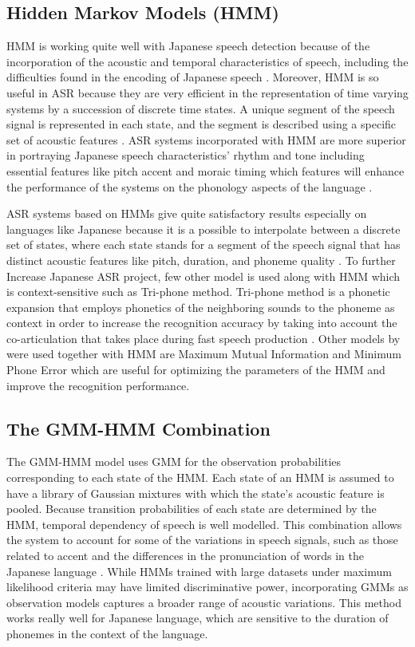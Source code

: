 \subsection{Hidden Markov Models (HMM)}
HMM is working quite well with Japanese speech detection because of the incorporation of the acoustic and temporal characteristics of speech, including the difficulties found in the encoding of Japanese speech \parencite{Tokuda1999Application}. Moreover, HMM is so useful in ASR because they are very efficient in the representation of time varying systems by a succession of discrete time states. A unique segment of the speech signal is represented in each state, and the segment is described using a specific set of acoustic features \parencite{juang1991hidden}. ASR systems incorporated with HMM are more superior in portraying Japanese speech characteristics’ rhythm and tone including essential features like pitch accent and moraic timing which features will enhance the performance of the systems on the phonology aspects of the language \parencite{Tokuda2000HMM}.

ASR systems based on HMMs give quite satisfactory results especially on languages like Japanese because it is a possible to interpolate between a discrete set of states, where each state stands for a segment of the speech signal that has distinct acoustic features like pitch, duration, and phoneme quality \parencite{juang1991hidden}. To further Increase Japanese ASR project, few other model is used along with HMM which is context-sensitive such as Tri-phone method. Tri-phone method is a phonetic expansion that employs phonetics of the neighboring sounds to the phoneme as context in order to increase the recognition accuracy by taking into account the co-articulation that takes place during fast speech production \parencite{Tokuda2000HMM}. Other models by \textcite{gales2008application} were used together with HMM are Maximum Mutual Information and Minimum Phone Error which are useful for optimizing the parameters of the HMM and improve the recognition performance. 


\subsection{The GMM-HMM Combination}
The GMM-HMM model uses GMM for the observation probabilities corresponding to each state of the HMM. Each state of an HMM is assumed to have a library of Gaussian mixtures with which the state’s acoustic feature is pooled. Because transition probabilities of each state are determined by the HMM, temporal dependency of speech is well modelled. This combination allows the system to account for some of the variations in speech signals, such as those related to accent and the differences in the pronunciation of words in the Japanese language \parencite{taheri2006fuzzy}. While HMMs trained with large datasets under maximum likelihood criteria may have limited discriminative power, incorporating GMMs as observation models captures a broader range of acoustic variations. This method works really well for Japanese language, which are sensitive to the duration of phonemes in the context of the language.

